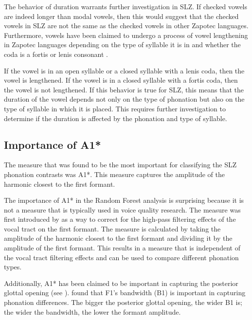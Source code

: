 The behavior of duration warrants further investigation in SLZ. If checked vowels are indeed longer than modal vowels, then this would suggest that the checked vowels in SLZ are not the same as the checked vowels in other Zapotec languages. Furthermore, vowels have been claimed to undergo a process of vowel lengthening in Zapotec languages depending on the type of syllable it is in and whether the coda is a fortis or lenis consonant \citep{nellisFortisLenisCajonos1980,uchiharaFortisLenisGlides2016}. 

If the vowel is in an open syllable or a closed syllable with a lenis coda, then the vowel is lengthened. If the vowel is in a closed syllable with a fortis coda, then the vowel is not lengthened. If this behavior is true for SLZ, this means that the duration of the vowel depends not only on the type of phonation but also on the type of syllable in which it is placed. This requires further investigation to determine if the duration is affected by the phonation and type of syllable.
\subsection{Importance of A1*} \label{sec:a1_discussion}

The measure that was found to be the most important for classifying the SLZ phonation contrasts was A1*. This measure captures the amplitude of the harmonic closest to the first formant. 

The importance of A1* in the Random Forest analysis is surprising because it is not a measure that is typically used in voice quality research. The measure was first introduced by \citet{fischer-jorgensenPhoneticAnalysisBreathy1968} as a way to correct for the high-pass filtering effects of the vocal tract on the first formant. The measure is calculated by taking the amplitude of the harmonic closest to the first formant and dividing it by the amplitude of the first formant. This results in a measure that is independent of the vocal tract filtering effects and can be used to compare different phonation types.

Additionally, A1* has been claimed to be important in capturing the posterior glottal opening (see \cite{hansonModelsPhonation2001}). \citet{hansonModelsPhonation2001} found that F1's bandwidth (B1) is important in capturing phonation differences. The bigger the posterior glottal opening, the wider B1 is; the wider the bandwidth, the lower the formant amplitude.

